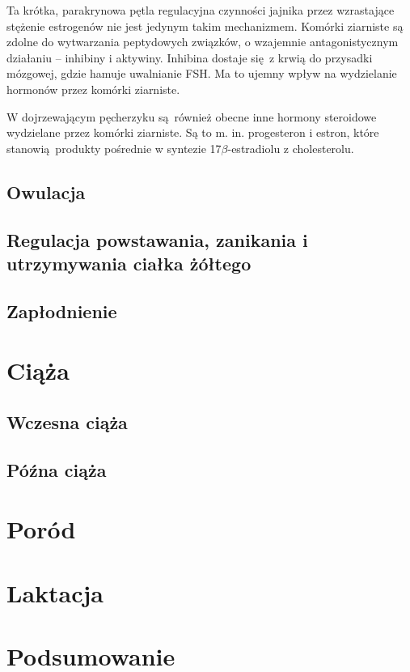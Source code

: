 \documentclass[two column, twoside, a4paper]{article}
\begin{document}
Ta krótka, parakrynowa pętla regulacyjna czynności jajnika przez wzrastające stężenie estrogenów nie jest jedynym takim mechanizmem. Komórki ziarniste są zdolne do wytwarzania peptydowych związków, o wzajemnie antagonistycznym działaniu -- inhibiny i aktywiny. Inhibina dostaje się z krwią do przysadki mózgowej, gdzie hamuje uwalnianie FSH. Ma to ujemny wpływ na wydzielanie hormonów przez komórki ziarniste. \autocite{Krzymowski2005, Woodruff1995, Findlay1993}

W dojrzewającym pęcherzyku są również obecne inne hormony steroidowe wydzielane przez komórki ziarniste. Są to m. in. progesteron i estron, które stanowią produkty pośrednie w syntezie 17$\beta$-estradiolu z cholesterolu.

\subsection{Owulacja}

\subsection{Regulacja powstawania, zanikania i utrzymywania ciałka żółtego}

\subsection{Zapłodnienie}

\section{Ciąża}

\subsection{Wczesna ciąża}

\subsection{Późna ciąża}

\section{Poród}

\section{Laktacja}

\section{Podsumowanie}


\printbibliography
\end{document}
